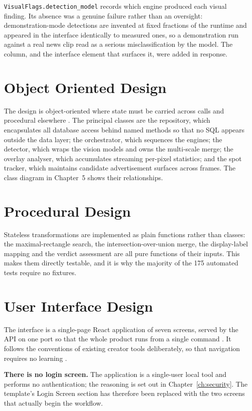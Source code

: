 \documentclass[
12pt,
a4paper,
oneside
]{report}
\begin{document}
\texttt{VisualFlags.detection\_model} records which engine produced each visual
finding. Its absence was a genuine failure rather than an oversight:
demonstration-mode detections are invented at fixed fractions of the runtime and
appeared in the interface identically to measured ones, so a demonstration run
against a real news clip read as a serious misclassification by the model. The
column, and the interface element that surfaces it, were added in response.

\section{Object Oriented Design}

The design is object-oriented where state must be carried across calls and
procedural elsewhere \cite{Gamma1994}. The principal classes are the repository,
which
encapsulates all database access behind named methods so that no SQL appears
outside the data layer; the orchestrator, which sequences the engines; the
detector, which wraps the vision models and owns the multi-scale merge; the
overlay analyser, which accumulates streaming per-pixel statistics; and the spot
tracker, which maintains candidate advertisement surfaces across frames. The
class diagram in Chapter~5 shows their relationships.

\section{Procedural Design}

Stateless transformations are implemented as plain functions rather than
classes: the maximal-rectangle search, the intersection-over-union merge, the
display-label mapping and the verdict assessment are all pure functions of their
inputs. This makes them directly testable, and it is why the majority of the 175
automated tests require no fixtures.

\section{User Interface Design}

The interface is a single-page React application of seven screens, served by the
API on one port so that the whole product runs from a single command
\cite{ReactDocs}. It follows the conventions of existing creator tools
deliberately, so that navigation requires no learning \cite{Nielsen2012}.

\textbf{There is no login screen.} The application is a single-user local tool
and performs no authentication; the reasoning is set out in
Chapter~\ref{ch:security}. The template's Login Screen section has therefore
been replaced with the two screens that actually begin the workflow.
\end{document}
